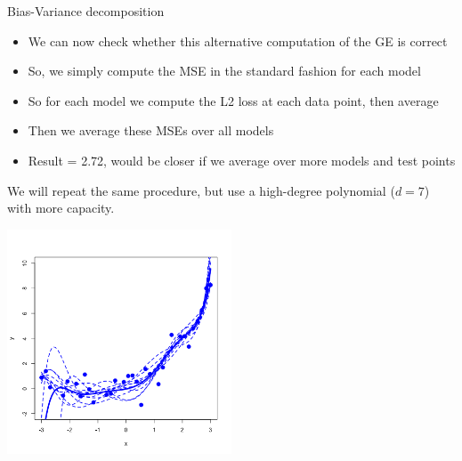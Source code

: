 \documentclass[11pt,compress,t,notes=noshow, xcolor=table]{beamer}
\begin{document}
\begin{vbframe} {Bias-Variance decomposition}
\begin{footnotesize}

\begin{itemize}
  \item We can now check whether this alternative computation of the GE is correct
  \item So, we simply compute the MSE in the standard fashion for each model
  \item So for each model we compute the L2 loss at each data point, then average
  \item Then we average these MSEs over all models
  \item Result = 2.72, would be closer if we average over more models and test points 
\end{itemize}

\end{footnotesize}


\framebreak


We will repeat the same procedure, but use a high-degree polynomial ($d=7$) with more capacity.

\begin{center}
  \includegraphics[width = 0.5\textwidth]{figure/bias_variance_decomposition-complex_model.png}
\end{center}


\framebreak


\end{vbframe}
\end{document}

